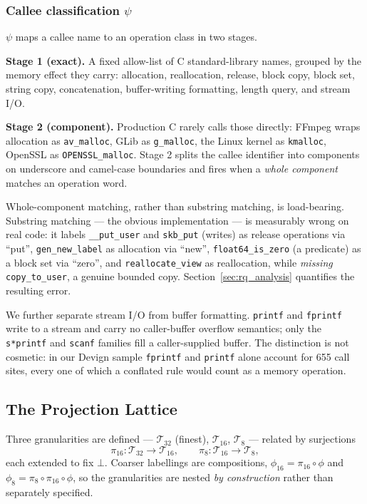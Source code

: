 \subsubsection{Callee classification $\psi$}
\label{sec:psi}

$\psi$ maps a callee name to an operation class in two stages.

\textbf{Stage 1 (exact).} A fixed allow-list of C standard-library names,
grouped by the memory effect they carry: allocation, reallocation, release,
block copy, block set, string copy, concatenation, buffer-writing formatting,
length query, and stream I/O.

\textbf{Stage 2 (component).} Production C rarely calls those directly:
FFmpeg wraps allocation as \texttt{av\_malloc}, GLib as \texttt{g\_malloc},
the Linux kernel as \texttt{kmalloc}, OpenSSL as \texttt{OPENSSL\_malloc}.
Stage 2 splits the callee identifier into components on underscore and
camel-case boundaries and fires when a \emph{whole component} matches an
operation word.

Whole-component matching, rather than substring matching, is load-bearing.
Substring matching --- the obvious implementation --- is measurably wrong on
real code: it labels \texttt{\_\_put\_user} and \texttt{skb\_put} (writes) as
release operations via ``put'', \texttt{gen\_new\_label} as allocation via
``new'', \texttt{float64\_is\_zero} (a predicate) as a block set via ``zero'',
and \texttt{reallocate\_view} as reallocation, while \emph{missing}
\texttt{copy\_to\_user}, a genuine bounded copy.
Section~\ref{sec:rq_analysis} quantifies the resulting error.

We further separate stream I/O from buffer formatting. \texttt{printf} and
\texttt{fprintf} write to a stream and carry no caller-buffer overflow
semantics; only the \texttt{s*printf} and \texttt{scanf} families fill a
caller-supplied buffer. The distinction is not cosmetic: in our Devign sample
\texttt{fprintf} and \texttt{printf} alone account for 655 call sites, every
one of which a conflated rule would count as a memory operation.

\subsection{The Projection Lattice}
\label{sec:lattice}

Three granularities are defined --- $\mathcal{T}_{32}$ (finest),
$\mathcal{T}_{16}$, $\mathcal{T}_{8}$ --- related by surjections
\begin{equation}
    \pi_{16} : \mathcal{T}_{32} \to \mathcal{T}_{16}, \qquad
    \pi_{8}  : \mathcal{T}_{16} \to \mathcal{T}_{8},
\label{eq:projections}
\end{equation}
each extended to fix $\bot$. Coarser labellings are compositions,
$\phi_{16} = \pi_{16} \circ \phi$ and
$\phi_{8} = \pi_8 \circ \pi_{16} \circ \phi$, so the granularities are nested
\emph{by construction} rather than separately specified.

